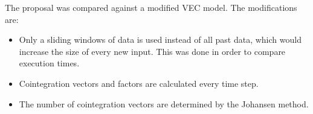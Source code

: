 The proposal was compared against a modified VEC model. The modifications are:

\begin{itemize}
\item Only a sliding windows of data is used instead of all past data,
which would increase the size of every new input. This was done in order
to compare execution times.
\item Cointegration vectors and factors are calculated every time step.
\item The number of cointegration vectors are determined by the Johansen method.
\end{itemize}

%
%
%
%
%
%
